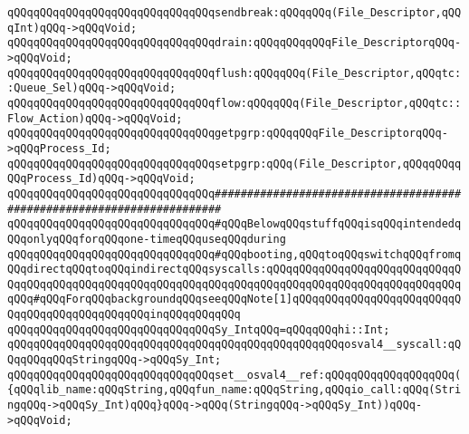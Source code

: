 \newline
\verb|qQQqqQQqqQQqqQQqqQQqqQQqqQQqqQQqsendbreak:qQQqqQQq(File_Descriptor,qQQqInt)qQQq->qQQqVoid;|\newline
\verb|qQQqqQQqqQQqqQQqqQQqqQQqqQQqqQQqdrain:qQQqqQQqqQQqFile_DescriptorqQQq->qQQqVoid;|\newline
\verb|qQQqqQQqqQQqqQQqqQQqqQQqqQQqqQQqflush:qQQqqQQq(File_Descriptor,qQQqtc::Queue_Sel)qQQq->qQQqVoid;|\newline
\verb|qQQqqQQqqQQqqQQqqQQqqQQqqQQqqQQqflow:qQQqqQQq(File_Descriptor,qQQqtc::Flow_Action)qQQq->qQQqVoid;|\newline
\newline
\verb|qQQqqQQqqQQqqQQqqQQqqQQqqQQqqQQqgetpgrp:qQQqqQQqFile_DescriptorqQQq->qQQqProcess_Id;|\newline
\verb|qQQqqQQqqQQqqQQqqQQqqQQqqQQqqQQqsetpgrp:qQQq(File_Descriptor,qQQqqQQqqQQqProcess_Id)qQQq->qQQqVoid;|\newline
\newline
\newline
\newline
\verb|qQQqqQQqqQQqqQQqqQQqqQQqqQQqqQQq#######################################################################|\newline
\verb|qQQqqQQqqQQqqQQqqQQqqQQqqQQqqQQq#qQQqBelowqQQqstuffqQQqisqQQqintendedqQQqonlyqQQqforqQQqone-timeqQQquseqQQqduring|\newline
\verb|qQQqqQQqqQQqqQQqqQQqqQQqqQQqqQQq#qQQqbooting,qQQqtoqQQqswitchqQQqfromqQQqdirectqQQqtoqQQqindirectqQQqsyscalls:qQQqqQQqqQQqqQQqqQQqqQQqqQQqqQQqqQQqqQQqqQQqqQQqqQQqqQQqqQQqqQQqqQQqqQQqqQQqqQQqqQQqqQQqqQQqqQQqqQQqqQQq#qQQqForqQQqbackgroundqQQqseeqQQqNote[1]qQQqqQQqqQQqqQQqqQQqqQQqqQQqqQQqqQQqqQQqqQQqqQQqinqQQqqQQqqQQq|\newline
\newline
\verb|qQQqqQQqqQQqqQQqqQQqqQQqqQQqqQQqSy_IntqQQq=qQQqqQQqhi::Int;|\newline
\newline
\verb|qQQqqQQqqQQqqQQqqQQqqQQqqQQqqQQqqQQqqQQqqQQqqQQqqQQqosval4__syscall:qQQqqQQqqQQqStringqQQq->qQQqSy_Int;|\newline
\verb|qQQqqQQqqQQqqQQqqQQqqQQqqQQqqQQqset__osval4__ref:qQQqqQQqqQQqqQQqqQQq({qQQqlib_name:qQQqString,qQQqfun_name:qQQqString,qQQqio_call:qQQq(StringqQQq->qQQqSy_Int)qQQq}qQQq->qQQq(StringqQQq->qQQqSy_Int))qQQq->qQQqVoid;|\newline
